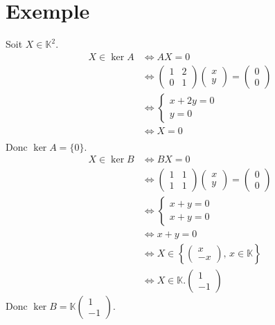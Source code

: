 \documentclass[../main.tex]{subfiles}
\begin{document}
\setcounter{section}{53}
\section{Exemple}
Soit $X \in \mathbb{K}^2$. \\
\begin{align*}
    X \in \ker A &\Leftrightarrow AX = 0 \\
    &\Leftrightarrow 
    \begin{pmatrix}
        1 & 2 \\
        0 & 1
    \end{pmatrix}
    \begin{pmatrix}
        x \\
        y
    \end{pmatrix}
    = 
    \begin{pmatrix}
        0 \\
        0
    \end{pmatrix} \\
    &\Leftrightarrow
    \begin{cases}
        x + 2y = 0 \\
        y = 0
    \end{cases} \\
    &\Leftrightarrow X = 0 \\
\end{align*}
Donc $\ker A = \{0\}$.
\begin{align*}
    X \in \ker B &\Leftrightarrow BX = 0 \\
    &\Leftrightarrow
    \begin{pmatrix}
        1 & 1 \\
        1 & 1
    \end{pmatrix}
    \begin{pmatrix}
        x \\
        y
    \end{pmatrix}
    =
    \begin{pmatrix}
        0 \\
        0
    \end{pmatrix} \\
    &\Leftrightarrow
    \begin{cases}
        x + y = 0 \\
        x + y = 0
    \end{cases} \\
    &\Leftrightarrow x + y = 0 \\
    &\Leftrightarrow X \in \left\{ 
    \begin{pmatrix}
        x \\
        -x
    \end{pmatrix}
    \text{, } x \in \mathbb{K}
    \right\} \\
    &\Leftrightarrow X \in \mathbb{K}.
    \begin{pmatrix}
        1 \\
        -1
    \end{pmatrix}
\end{align*}
Donc $\ker B = \mathbb{K} 
\begin{pmatrix}
    1 \\
    -1
\end{pmatrix}
$.
\end{document}
